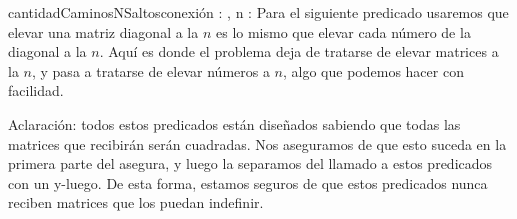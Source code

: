 \documentclass[10pt,a4paper]{article}
\begin{document}
\begin{proc}{cantidadCaminosNSaltos}{\Inout conexi\'on : \TLista{\TLista{\ent}}, \In n : \ent}{}
	\vspace{0.3cm}
	Para el siguiente predicado usaremos que elevar una matriz diagonal a la $n$ es lo mismo que elevar cada n\'umero 
	de la diagonal a la $n$. Aqu\'i es donde el problema deja de tratarse de elevar matrices a la $n$, y pasa a 
	tratarse de elevar n\'umeros a $n$, algo que podemos hacer con facilidad.
	
	{}
	
	{}
	
	{}
	
	\vspace{0.3cm}
	Aclaraci\'on: todos estos predicados est\'an diseñados sabiendo que todas las matrices que recibirán serán cuadradas. Nos aseguramos de que esto 
	suceda en la primera parte del asegura, y luego la separamos del llamado a estos predicados con un y-luego. De esta forma, estamos seguros de que 
	estos predicados nunca reciben matrices que los puedan indefinir.
\end{proc}

\pagebreak
\end{document}
